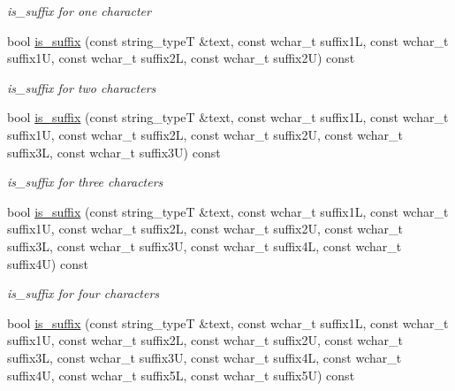 \begin{DoxyCompactItemize}
\begin{DoxyCompactList}\small\item\em is\+\_\+suffix for one character \end{DoxyCompactList}\item 
\hypertarget{classstemming_1_1stem_aad4dff424a3ae8a82dcfe6adac7c9d30}{bool \hyperlink{classstemming_1_1stem_aad4dff424a3ae8a82dcfe6adac7c9d30}{is\+\_\+suffix} (const string\+\_\+type\+T \&text, const wchar\+\_\+t suffix1\+L, const wchar\+\_\+t suffix1\+U, const wchar\+\_\+t suffix2\+L, const wchar\+\_\+t suffix2\+U) const }\label{classstemming_1_1stem_aad4dff424a3ae8a82dcfe6adac7c9d30}

\begin{DoxyCompactList}\small\item\em is\+\_\+suffix for two characters \end{DoxyCompactList}\item 
\hypertarget{classstemming_1_1stem_abbe6496d43b49dab0745e6d6b4e2831d}{bool \hyperlink{classstemming_1_1stem_abbe6496d43b49dab0745e6d6b4e2831d}{is\+\_\+suffix} (const string\+\_\+type\+T \&text, const wchar\+\_\+t suffix1\+L, const wchar\+\_\+t suffix1\+U, const wchar\+\_\+t suffix2\+L, const wchar\+\_\+t suffix2\+U, const wchar\+\_\+t suffix3\+L, const wchar\+\_\+t suffix3\+U) const }\label{classstemming_1_1stem_abbe6496d43b49dab0745e6d6b4e2831d}

\begin{DoxyCompactList}\small\item\em is\+\_\+suffix for three characters \end{DoxyCompactList}\item 
\hypertarget{classstemming_1_1stem_a694dd20e52adc89edadf120bf92a28ff}{bool \hyperlink{classstemming_1_1stem_a694dd20e52adc89edadf120bf92a28ff}{is\+\_\+suffix} (const string\+\_\+type\+T \&text, const wchar\+\_\+t suffix1\+L, const wchar\+\_\+t suffix1\+U, const wchar\+\_\+t suffix2\+L, const wchar\+\_\+t suffix2\+U, const wchar\+\_\+t suffix3\+L, const wchar\+\_\+t suffix3\+U, const wchar\+\_\+t suffix4\+L, const wchar\+\_\+t suffix4\+U) const }\label{classstemming_1_1stem_a694dd20e52adc89edadf120bf92a28ff}

\begin{DoxyCompactList}\small\item\em is\+\_\+suffix for four characters \end{DoxyCompactList}\item 
\hypertarget{classstemming_1_1stem_a001757aa7530b8acea05df8405def025}{bool \hyperlink{classstemming_1_1stem_a001757aa7530b8acea05df8405def025}{is\+\_\+suffix} (const string\+\_\+type\+T \&text, const wchar\+\_\+t suffix1\+L, const wchar\+\_\+t suffix1\+U, const wchar\+\_\+t suffix2\+L, const wchar\+\_\+t suffix2\+U, const wchar\+\_\+t suffix3\+L, const wchar\+\_\+t suffix3\+U, const wchar\+\_\+t suffix4\+L, const wchar\+\_\+t suffix4\+U, const wchar\+\_\+t suffix5\+L, const wchar\+\_\+t suffix5\+U) const }\label{classstemming_1_1stem_a001757aa7530b8acea05df8405def025}


\end{DoxyCompactItemize}
